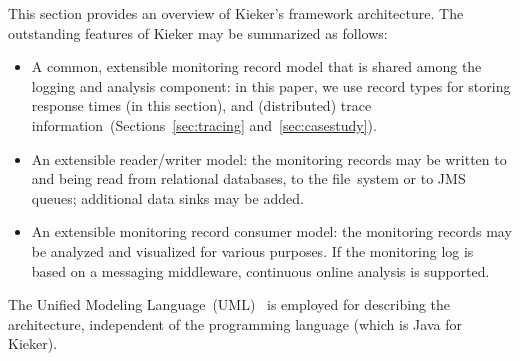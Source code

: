 \newcommand{\KiekerTerminology}[1]{{\small\sffamily #1}}
\newcommand{\MonitoringProbe}{\KiekerTerminology{Monitoring Probe}}
\newcommand{\MonitoringProbes}{\KiekerTerminology{Monitoring Probes}}
\newcommand{\MonitoringLog}{\KiekerTerminology{Monitoring Log}}
\newcommand{\MonitoringLogWriter}{\KiekerTerminology{Monitoring Log Writer}}
\newcommand{\MonitoringLogWriters}{\KiekerTerminology{Monitoring Log Writers}}
\newcommand{\MonitoringLogReader}{\KiekerTerminology{Monitoring Log Reader}}
\newcommand{\MonitoringLogReaders}{\KiekerTerminology{Monitoring Log Readers}}
\newcommand{\MonitoringRecord}{\KiekerTerminology{Monitoring Record}}
\newcommand{\MonitoringRecords}{\KiekerTerminology{Monitoring Records}}
\newcommand{\MonitoringRecordConsumer}{\KiekerTerminology{Monitoring Record Consumer}}
\newcommand{\MonitoringRecordConsumers}{\KiekerTerminology{Monitoring Record Consumers}}
\newcommand{\KiekerTpmon}{\KiekerTerminology{Kieker.Tpmon}}
\newcommand{\KiekerTpan}{\KiekerTerminology{Kieker.Tpan}}
\newcommand{\TpmonController}{\KiekerTerminology{TpmonController}}
\newcommand{\TpanInstance}{\KiekerTerminology{TpanInstance}}

\noindent This section provides an overview of Kieker's framework
architecture.
The outstanding features of Kieker may be summarized as follows:
 \begin{itemize}
 \item A common, extensible monitoring record model that is shared among the logging and analysis component: in this paper, we use record types for storing response times (in this section), %
 and (distributed) trace information~(Sections~\ref{sec:tracing} and~\ref{sec:casestudy}). %
 \item An extensible reader/writer model: the monitoring records may be written to and being read from relational databases, to the file~system or to JMS queues; additional data sinks may be added.
\pagebreak
 \item An extensible monitoring record consumer model: the monitoring records may be analyzed and visualized for various purposes.  If the monitoring log is based on a messaging middleware, continuous online analysis is supported.
 \end{itemize}
 
\noindent The Unified Modeling Language~(UML)~%
\citep{OMG2007UML22Superstructure} is employed for describing the architecture, independent of the programming language (which is Java for Kieker).


